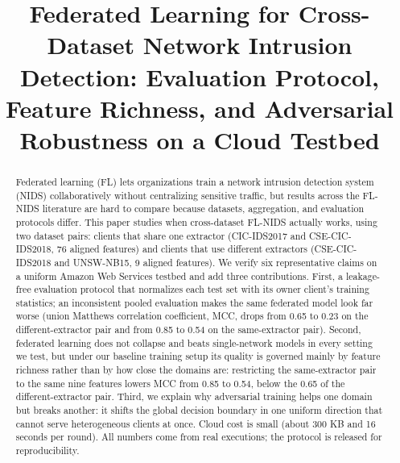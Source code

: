 \documentclass[conference,onecolumn]{IEEEtran}
\begin{document}
\title{Federated Learning for Cross-Dataset Network Intrusion Detection:
Evaluation Protocol, Feature Richness, and Adversarial Robustness
on a Cloud Testbed}

\author{
\and
{}
\and
{}
}

\maketitle

\begin{abstract}
Federated learning (FL) lets organizations train a network intrusion detection system (NIDS)
collaboratively without centralizing sensitive traffic, but results across the FL-NIDS literature are
hard to compare because datasets, aggregation, and evaluation protocols differ. This paper studies
when cross-dataset FL-NIDS actually works, using two dataset pairs: clients that share one extractor
(CIC-IDS2017 and CSE-CIC-IDS2018, 76 aligned features) and clients that use different extractors
(CSE-CIC-IDS2018 and UNSW-NB15, 9 aligned features). We verify six representative claims on a uniform
Amazon Web Services testbed and add three contributions. First, a leakage-free evaluation protocol that
normalizes each test set with its owner client's training statistics; an inconsistent pooled evaluation
makes the same federated model look far worse (union Matthews correlation coefficient, MCC, drops from
0.65 to 0.23 on the different-extractor pair and from 0.85 to 0.54 on the same-extractor pair). Second,
federated learning does not collapse and beats single-network models in every setting we test, but under our baseline training setup its
quality is governed mainly by feature richness rather than by how close the domains are: restricting
the same-extractor pair to the same nine features lowers MCC from 0.85 to 0.54, below the 0.65 of the
different-extractor pair. Third, we explain why adversarial training helps one domain but breaks
another: it shifts the global decision boundary in one uniform direction that cannot serve
heterogeneous clients at once. Cloud cost is small (about 300 KB and 16 seconds per round). All numbers
come from real executions; the protocol is released for reproducibility.
\end{abstract}
\end{document}
